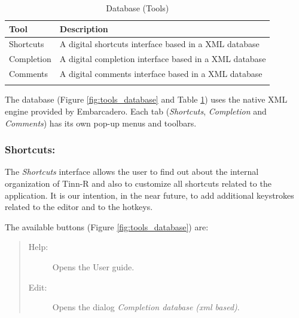 \begin{table}
  \begin{footnotesize}
    \begin{tabularx}{\textwidth}{>{\hsize=0.3\hsize}X>{\hsize=0.7\hsize}X}\\
      \hline
      \textbf{Tool} & \textbf{Description} \\
      \hline
      Shortcuts & A digital shortcuts interface based in a XML database \\
      Completion & A digital completion interface based in a XML database \\
      Comments & A digital comments interface based in a XML database \\
      \hline
      \\
    \end{tabularx}
  \end{footnotesize}
  \caption{Database (Tools)}
  \label{tab:tools_database}
\end{table}


The database
(Figure \ref{fig:tools_database} and
Table \ref{tab:tools_database})
uses the native XML engine provided by Embarcadero. Each tab
(\textit{Shortcuts}, \textit{Completion} and
\textit{Comments}) has its own pop-up menus and toolbars.


\subsubsection{Shortcuts:}

The \textit{Shortcuts} interface allows the user to find out about
the internal organization of Tinn-R and also to customize all
shortcuts related to the application. It is our intention, in
the near future, to add additional keystrokes related to the
editor and to the \RR{} hotkeys.

The available buttons
(Figure \ref{fig:tools_database})
are:

\begin{quote}
  \begin{footnotesize}
    \begin{description}
      \item[Help:]
        Opens the User guide.
      \item[Edit:]
        Opens the dialog \textit{Completion database (xml based)}.
    \end{description}
  \end{footnotesize}
\end{quote}

